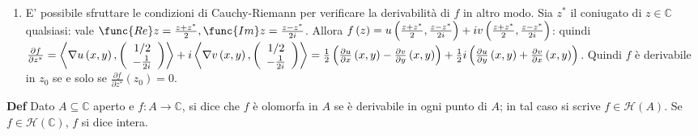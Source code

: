 \documentclass{article}
\begin{document}
\begin{enumerate}
\item E' possibile sfruttare le condizioni di Cauchy-Riemann per verificare
la derivabilit\`{a} di $f$ in altro modo. Sia $z^{\ast }$ il coniugato di $%
z\in 
\mathbb{C}
$ qualsiasi: vale $\func{Re}z=\frac{z+z^{\ast }}{2},\func{Im}z=\frac{%
z-z^{\ast }}{2i}$. Allora $f\left( z\right) =u\left( \frac{z+z^{\ast }}{2},%
\frac{z-z^{\ast }}{2i}\right) +iv\left( \frac{z+z^{\ast }}{2},\frac{%
z-z^{\ast }}{2i}\right) $: quindi $\frac{\partial f}{\partial z^{\ast }}%
=\left\langle \nabla u\left( x,y\right) ,\left( 
\begin{array}{c}
1/2 \\ 
-\frac{1}{2i}%
\end{array}%
\right) \right\rangle +i\left\langle \nabla v\left( x,y\right) ,\left( 
\begin{array}{c}
1/2 \\ 
-\frac{1}{2i}%
\end{array}%
\right) \right\rangle =\frac{1}{2}\left( \frac{\partial u}{\partial x}\left(
x,y\right) -\frac{\partial v}{\partial y}\left( x,y\right) \right) +\frac{1}{%
2}i\left( \frac{\partial u}{\partial y}\left( x,y\right) +\frac{\partial v}{%
\partial x}\left( x,y\right) \right) $. Quindi $f$ \`{e} derivabile in $%
z_{0} $ se e solo se $\frac{\partial f}{\partial z^{\ast }}\left(
z_{0}\right) =0$.
\end{enumerate}

\textbf{Def }Dato $A\subseteq 
\mathbb{C}
$ aperto e $f:A\rightarrow 
\mathbb{C}
$, si dice che $f$ \`{e} olomorfa in $A$ se \`{e} derivabile in ogni punto
di $A$; in tal caso si scrive $f\in \mathcal{H}\left( A\right) $. Se $f\in 
\mathcal{H}\left( 
\mathbb{C}
\right) $, $f$ si dice intera.
\end{document}
